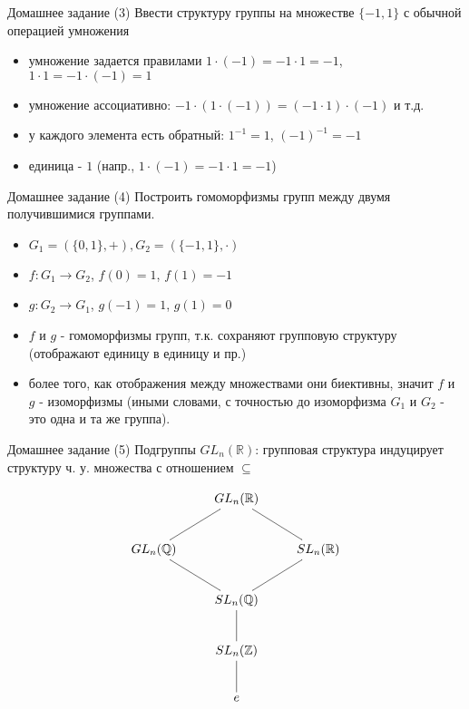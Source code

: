 \documentclass{beamer}
\begin{document}
\begin{frame}{Домашнее задание (3)}
Ввести структуру группы на множестве $\{-1, 1\}$ с обычной операцией умножения\\
  \begin{itemize}
    \item умножение задается правилами $1 \cdot (-1) = -1 \cdot 1 = -1$, $1 \cdot 1 = -1 \cdot (-1) = 1$ 
    \item умножение ассоциативно: $-1 \cdot (1 \cdot (-1)) = (-1 \cdot 1) \cdot (-1)$ и т.д.
    \item у каждого элемента есть обратный: $1^{-1} = 1$, $(-1)^{-1} = -1$
    \item единица - $1$ (напр., $1 \cdot (-1) = -1 \cdot 1 = -1$)
  \end{itemize}  
\end{frame}

\begin{frame}{Домашнее задание (4)}
Построить гомоморфизмы групп между двумя получившимися группами.
  \begin{itemize}
    \item $G_1 = (\{0, 1\}, +), G_2 = (\{-1, 1\}, \cdot)$
    \item $f : G_1 \to G_2$, $f(0) = 1$, $f(1) = -1$
    \item $g : G_2 \to G_1$, $g(-1) = 1$, $g(1) = 0$
    \item $f$ и $g$ - гомоморфизмы групп, т.к. сохраняют групповую структуру (отображают единицу в единицу и пр.)
    \item более того, как отображения между множествами они биективны, значит $f$ и $g$ - изоморфизмы (иными словами, с точностью до изоморфизма $G_1$ и $G_2$ - это одна и та же группа).
  \end{itemize}  
\end{frame}

\begin{frame}{Домашнее задание (5)}
Подгруппы $GL_n(\mathbb{R})$: групповая структура индуцирует структуру ч. у. множества с отношением $\subseteq$
  \begin{center}
\[
\xymatrix{
     & GL_n(\mathbb{R}) \ar@{-}[ld] \ar@{-}[rd] & \\
     GL_n(\mathbb{Q}) \ar@{-}[rd] & & SL_n(\mathbb{R}) \ar@{-}[ld] \\
     & SL_n(\mathbb{Q}) \ar@{-}[d] & \\
     & SL_n(\mathbb{Z}) \ar@{-}[d] & \\
     & e & 
     }
     \]
  \end{center}  
\end{frame}
\end{document}
